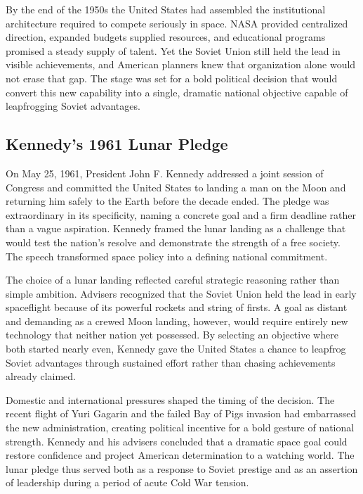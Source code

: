 By the end of the 1950s the United States had assembled the institutional architecture required to compete seriously in space. NASA provided centralized direction, expanded budgets supplied resources, and educational programs promised a steady supply of talent. Yet the Soviet Union still held the lead in visible achievements, and American planners knew that organization alone would not erase that gap. The stage was set for a bold political decision that would convert this new capability into a single, dramatic national objective capable of leapfrogging Soviet advantages. \cite{logsdon2010} \cite{nasa2019}

\subsection{Kennedy's 1961 Lunar Pledge}
On May 25, 1961, President John F. Kennedy addressed a joint session of Congress and committed the United States to landing a man on the Moon and returning him safely to the Earth before the decade ended. The pledge was extraordinary in its specificity, naming a concrete goal and a firm deadline rather than a vague aspiration. Kennedy framed the lunar landing as a challenge that would test the nation's resolve and demonstrate the strength of a free society. The speech transformed space policy into a defining national commitment.

The choice of a lunar landing reflected careful strategic reasoning rather than simple ambition. Advisers recognized that the Soviet Union held the lead in early spaceflight because of its powerful rockets and string of firsts. A goal as distant and demanding as a crewed Moon landing, however, would require entirely new technology that neither nation yet possessed. By selecting an objective where both started nearly even, Kennedy gave the United States a chance to leapfrog Soviet advantages through sustained effort rather than chasing achievements already claimed.

Domestic and international pressures shaped the timing of the decision. The recent flight of Yuri Gagarin and the failed Bay of Pigs invasion had embarrassed the new administration, creating political incentive for a bold gesture of national strength. Kennedy and his advisers concluded that a dramatic space goal could restore confidence and project American determination to a watching world. The lunar pledge thus served both as a response to Soviet prestige and as an assertion of leadership during a period of acute Cold War tension.

